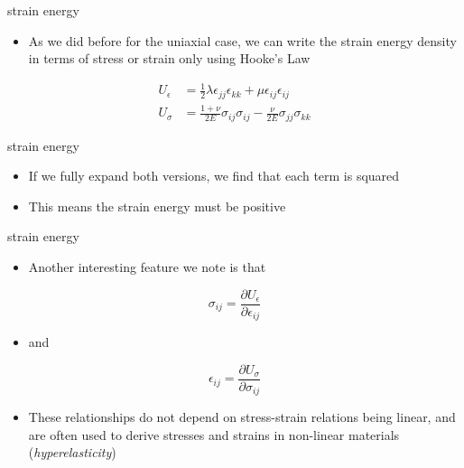 \documentclass[
  letterpaper,
  ignorenonframetext,
  aspectratio=43,
  handout,
  12pt]{beamer}
\providecommand{\tightlist}{%
  \setlength{\itemsep}{0pt}\setlength{\parskip}{0pt}}
\providecommand{\tightlist}{%
\setlength{\itemsep}{0pt}\setlength{\parskip}{0pt}}
\begin{document}
\begin{frame}{strain energy}
\protect\hypertarget{strain-energy-11}{}
\begin{itemize}
\tightlist
\item
  As we did before for the uniaxial case, we can write the strain energy
  density in terms of stress or strain only using Hooke's Law
\end{itemize}

\[\begin{aligned}
    U_\epsilon &= \frac{1}{2} \lambda \epsilon_{jj} \epsilon_{kk} + \mu \epsilon_{ij}\epsilon_{ij}\\
    U_\sigma &= \frac{1+\nu}{2E}\sigma_{ij}\sigma_{ij} - \frac{\nu}{2E} \sigma_{jj}\sigma_{kk}
\end{aligned}\]
\end{frame}

\begin{frame}{strain energy}
\protect\hypertarget{strain-energy-12}{}
\begin{itemize}
\tightlist
\item
  If we fully expand both versions, we find that each term is squared
\item
  This means the strain energy must be positive
\end{itemize}
\end{frame}

\begin{frame}{strain energy}
\protect\hypertarget{strain-energy-13}{}
\begin{itemize}
\tightlist
\item
  Another interesting feature we note is that
\end{itemize}

\[\sigma_{ij} = \frac{\partial U_\epsilon}{\partial \epsilon_{ij}}\]

\begin{itemize}
\tightlist
\item
  and
\end{itemize}

\[\epsilon_{ij} = \frac{\partial U_\sigma}{\partial \sigma_{ij}}\]

\begin{itemize}
\tightlist
\item
  These relationships do not depend on stress-strain relations being
  linear, and are often used to derive stresses and strains in
  non-linear materials (\emph{hyperelasticity})
\end{itemize}
\end{frame}
\end{document}
